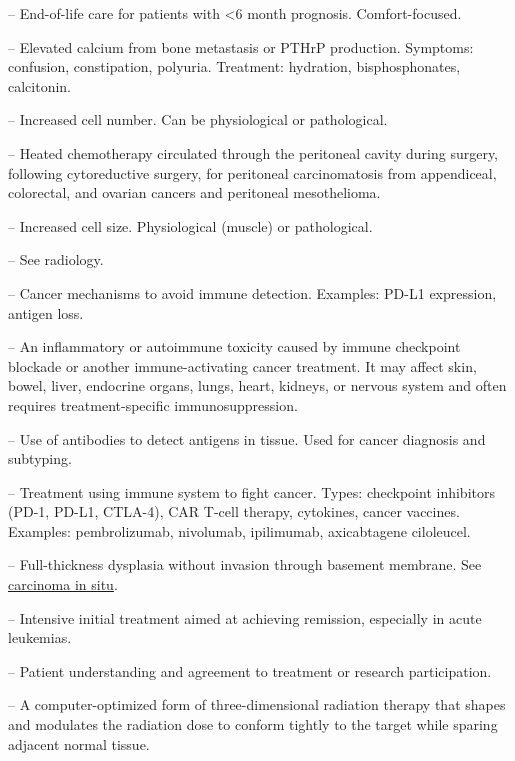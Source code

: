 -- End-of-life care for patients with <6 month prognosis. Comfort-focused.

-- Elevated calcium from bone metastasis or PTHrP production. Symptoms: confusion, constipation, polyuria. Treatment: hydration, bisphosphonates, calcitonin.

-- Increased cell number. Can be physiological or pathological.

-- Heated chemotherapy circulated through the peritoneal cavity during surgery, following cytoreductive surgery, for peritoneal carcinomatosis from appendiceal, colorectal, and ovarian cancers and peritoneal mesothelioma.

-- Increased cell size. Physiological (muscle) or pathological.

-- See radiology.

-- Cancer mechanisms to avoid immune detection. Examples: PD-L1 expression, antigen loss.

-- An inflammatory or autoimmune toxicity caused by immune checkpoint blockade or another immune-activating cancer treatment. It may affect skin, bowel, liver, endocrine organs, lungs, heart, kidneys, or nervous system and often requires treatment-specific immunosuppression.

-- Use of antibodies to detect antigens in tissue. Used for cancer diagnosis and subtyping.

-- Treatment using immune system to fight cancer. Types: checkpoint inhibitors (PD-1, PD-L1, CTLA-4), CAR T-cell therapy, cytokines, cancer vaccines. Examples: pembrolizumab, nivolumab, ipilimumab, axicabtagene ciloleucel.

-- Full-thickness dysplasia without invasion through basement membrane. See \hyperlink{Carcinoma in Situ}{carcinoma in situ}.

-- Intensive initial treatment aimed at achieving remission, especially in acute leukemias.

-- Patient understanding and agreement to treatment or research participation.

-- A computer-optimized form of three-dimensional radiation therapy that shapes and modulates the radiation dose to conform tightly to the target while sparing adjacent normal tissue.

